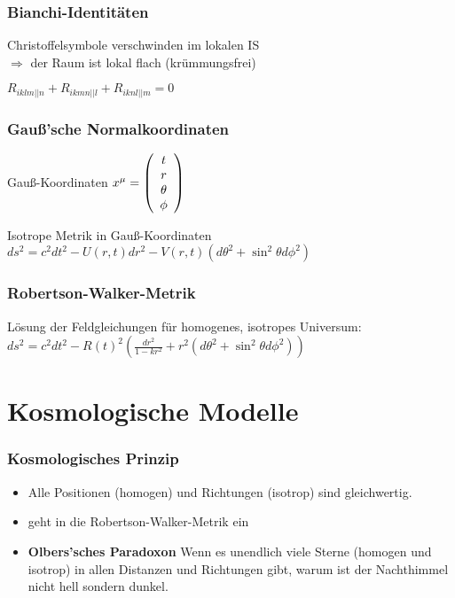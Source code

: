 \documentclass{beamer}
\begin{document}
\begin{frame}\frametitle{Bianchi-Identitäten}

Christoffelsymbole verschwinden im lokalen IS\\ $\Rightarrow$ der Raum ist lokal flach (krümmungsfrei)

\vspace{.5cm}

$\boxed{R_{iklm||n} + R_{ikmn||l} + R_{iknl||m} = 0}$

\end{frame}

\begin{frame}\frametitle{Gauß'sche Normalkoordinaten}

\begin{block}{Gauß-Koordinaten}
$x^\mu = \left( \begin{array} ct \\ r \\ \theta \\ \phi \end{array} \right)$
\end{block}

\begin{block}{Isotrope Metrik in Gauß-Koordinaten}
$ds^2 = c^2 dt^2 - U(r,t)dr^2 - V(r,t)(d\theta^2 + \sin^2{\theta}d\phi^2)$
\end{block}

\end{frame}

\begin{frame}\frametitle{Robertson-Walker-Metrik}
Lösung der Feldgleichungen für homogenes, isotropes Universum:\\[.5cm]
$ds^2 = c^2dt^2 - R(t)^2\left(\frac{dr^2}{1-kr^2}+r^2(d\theta^2 + \sin^2\theta d\phi^2)\right)$
\end{frame}

\section{Kosmologische Modelle}

\begin{frame}\frametitle{Kosmologisches Prinzip}

\begin{itemize}
\item \glqq Alle Positionen (homogen) und Richtungen (isotrop) sind gleichwertig.\grqq
\item geht in die Robertson-Walker-Metrik ein
\item \textbf{Olbers'sches Paradoxon} Wenn es unendlich viele Sterne (homogen und isotrop) in allen Distanzen und Richtungen gibt, warum ist der Nachthimmel nicht hell sondern dunkel.\end{itemize}

\end{frame}
\end{document}
